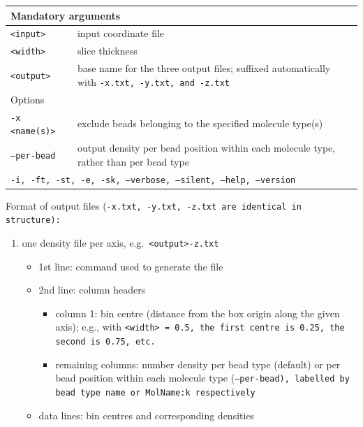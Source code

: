 \noindent
\begin{longtable}{p{}p{}}
  \toprule
  \multicolumn{2}{l}{Mandatory arguments} \\
  \midrule
  \tt{<input>}  & input coordinate file \\
  \tt{<width>}  & slice thickness \\
  \tt{<output>} & base name for the three output files; suffixed automatically
                  with \tt{-x.txt}, \tt{-y.txt}, and \tt{-z.txt} \\
  \toprule
  \multicolumn{2}{l}{Options} \\
  \midrule
  \tt{-x <name(s)>} & exclude beads belonging to the specified molecule
                      type(s) \\
  \tt{--per-bead}   & output density per bead position within each molecule
                      type, rather than per bead type \\
  \midrule
  \multicolumn{2}{p{0.948\textwidth}}{\tt{-i}, \tt{-ft}, \tt{-st}, \tt{-e},
    \tt{-sk}, \tt{--verbose}, \tt{--silent}, \tt{--help}, \tt{--version}} \\
  \bottomrule
\end{longtable}

\noindent
Format of output files (\tt{-x.txt}, \tt{-y.txt}, \tt{-z.txt} are identical in
structure):
\begin{enumerate}[nosep,leftmargin=20pt]
  \item one density file per axis, e.g.\ \tt{<output>-z.txt}
    \begin{itemize}[nosep,leftmargin=5pt]
      \item 1st line: command used to generate the file
      \item 2nd line: column headers
        \begin{itemize}[nosep,leftmargin=10pt]
          \item column 1: bin centre (distance from the box origin along the
            given axis); e.g., with \tt{<width>} = 0.5, the first centre is
            0.25, the second is 0.75, etc.
          \item remaining columns: number density per bead type (default) or
            per bead position within each molecule type (\tt{--per-bead}),
            labelled by bead type name or \tt{MolName:k} respectively
        \end{itemize}
      \item data lines: bin centres and corresponding densities
    \end{itemize}
\end{enumerate}
